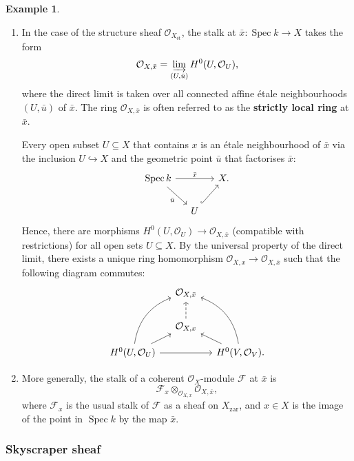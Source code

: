\documentclass{report}
\DeclareMathOperator{\Spec}{Spec}
\theoremstyle{definition}
\newtheorem{example}[equation]{Example}
\begin{document}
\begin{example}
\begin{enumerate}
\item In the case of the structure sheaf $\mathcal{O}_{X_{\text{\'{e}t}}}$, the stalk at $\bar{x}:\Spec k\rightarrow X$ takes the form
\[\mathcal{O}_{X,\bar{x}}=\varinjlim_{(U,\bar{u})}H^0(U,\mathcal{O}_U),\]
where the direct limit is taken over all connected affine \'{e}tale neighbourhoods $(U,\bar{u})$ of $\bar{x}$. The ring $\mathcal{O}_{X,\bar{x}}$ is often referred to as the \textbf{strictly local ring} at $\bar{x}$.

Every open subset $U\subseteq X$ that contains $x$ is an \'{e}tale neighbourhood of $\bar{x}$ via the inclusion $U\hookrightarrow X$ and the geometric point $\bar{u}$ that factorises $\bar{x}$:
\[
\begin{tikzcd}[column sep=small]
\Spec k\arrow[rr,"\bar{x}"]\arrow[rd,swap,"\bar{u}"]&&X.\\
&U\arrow[ru,hook]
\end{tikzcd}
\]
Hence, there are morphisms $H^0(U,\mathcal{O}_U)\rightarrow\mathcal{O}_{X,\bar{x}}$ (compatible with restrictions) for all open sets $U\subseteq X$. By the universal property of the direct limit, there exists a unique ring homomorphism $\mathcal{O}_{X,x}\rightarrow\mathcal{O}_{X,\bar{x}}$ such that the following diagram commutes:
\[
\begin{tikzcd}[column sep=small,row sep=small]
&\mathcal{O}_{X,\bar{x}}\\\\
&\mathcal{O}_{X,x}\arrow[uu,dashed]\\
H^0(U,\mathcal{O}_U)\arrow[rr]\arrow[ru]\arrow[ruuu,bend left]&&H^0(V,\mathcal{O}_V).\arrow[lu]\arrow[luuu,bend right]
\end{tikzcd}
\]

\item More generally, the stalk of a coherent $\mathcal{O}_X$-module $\mathcal{F}$ at $\bar{x}$ is
\[\mathcal{F}_x\otimes_{\mathcal{O}_{X,x}}\mathcal{O}_{X,\bar{x}},\]
where $\mathcal{F}_x$ is the usual stalk of $\mathcal{F}$ as a sheaf on $X_{\text{zar}}$, and $x\in X$ is the image of the point in $\Spec k$ by the map $\bar{x}$.
\end{enumerate}
\end{example}

\subsubsection*{Skyscraper sheaf}
\end{document}
